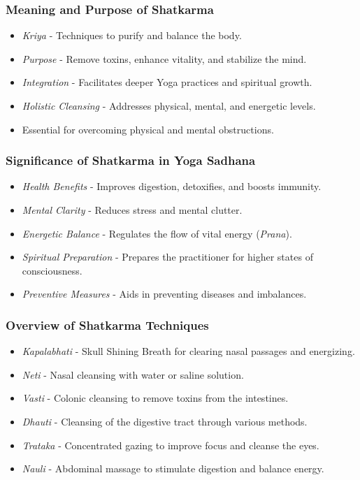\begin{frame}[fragile]\frametitle{Meaning and Purpose of Shatkarma}

      \begin{itemize}
		\item \textit{Kriya} - Techniques to purify and balance the body.
		\item \textit{Purpose} - Remove toxins, enhance vitality, and stabilize the mind.
		\item \textit{Integration} - Facilitates deeper Yoga practices and spiritual growth.
		\item \textit{Holistic Cleansing} - Addresses physical, mental, and energetic levels.
		\item Essential for overcoming physical and mental obstructions.
	  \end{itemize}

\end{frame}

\begin{frame}[fragile]\frametitle{Significance of Shatkarma in Yoga Sadhana}

      \begin{itemize}
		\item \textit{Health Benefits} - Improves digestion, detoxifies, and boosts immunity.
		\item \textit{Mental Clarity} - Reduces stress and mental clutter.
		\item \textit{Energetic Balance} - Regulates the flow of vital energy (\textit{Prana}).
		\item \textit{Spiritual Preparation} - Prepares the practitioner for higher states of consciousness.
		\item \textit{Preventive Measures} - Aids in preventing diseases and imbalances.
	  \end{itemize}

\end{frame}

\begin{frame}[fragile]\frametitle{Overview of Shatkarma Techniques}

      \begin{itemize}
		\item \textit{Kapalabhati} - Skull Shining Breath for clearing nasal passages and energizing.
		\item \textit{Neti} - Nasal cleansing with water or saline solution.
		\item \textit{Vasti} - Colonic cleansing to remove toxins from the intestines.
		\item \textit{Dhauti} - Cleansing of the digestive tract through various methods.
		\item \textit{Trataka} - Concentrated gazing to improve focus and cleanse the eyes.
		\item \textit{Nauli} - Abdominal massage to stimulate digestion and balance energy.
	  \end{itemize}

\end{frame}


